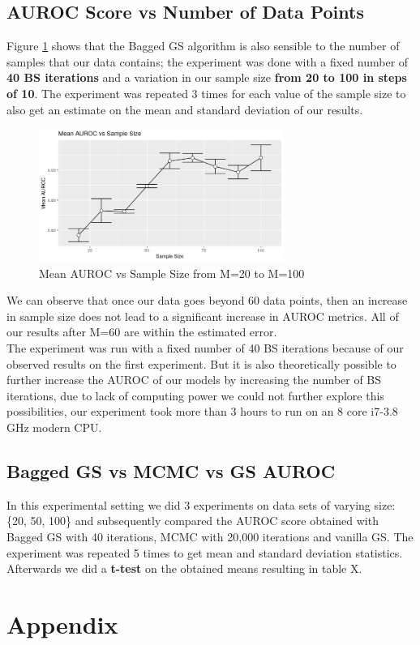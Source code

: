 \documentclass{article}
\begin{document}
	\subsection{AUROC Score vs Number of Data Points}
	Figure \ref{fig:auroc_sample_size} shows that the Bagged GS algorithm is also sensible to the number of
	samples that our data contains; the experiment was done with a fixed number
	of \textbf{40 BS iterations} and a variation in our sample size \textbf{from 20 to 100 in
	steps of 10}. The experiment was repeated 3 times for each value of the sample
	size to also get an estimate on the mean and standard deviation of our
	results.
	\begin{figure}[ht]
		\includegraphics[width=8cm]{auroc_sample_size}
		\centering
		\caption{Mean AUROC vs Sample Size from M=20 to M=100}
		\label{fig:auroc_sample_size}
	\end{figure}
	We can observe that once our data goes beyond 60 data points, then an
	increase in sample size does not lead to a significant increase in AUROC
	metrics. All of our results after M=60 are within the estimated error. \\
	The experiment was run with a fixed number of 40 BS iterations because of our
	observed results on the first experiment. But it is also theoretically
	possible to further increase the AUROC of our models by increasing the number
	of BS iterations, due to lack of computing power we could not further explore
	this possibilities, our experiment took more
	than 3 hours to run on an 8 core i7-3.8 GHz modern CPU.

	\subsection{Bagged GS vs MCMC vs GS AUROC}
	In this experimental setting we did 3 experiments on data sets of varying
	size: \{20, 50, 100\} and subsequently compared the AUROC score obtained with
	Bagged GS with 40 iterations, MCMC with 20,000 iterations and vanilla GS. The
	experiment was repeated 5 times to get mean and standard deviation
	statistics. Afterwards we did a \textbf{t-test} on the obtained means resulting in
	table X.

	\section*{Appendix}

	
	
\end{document}
